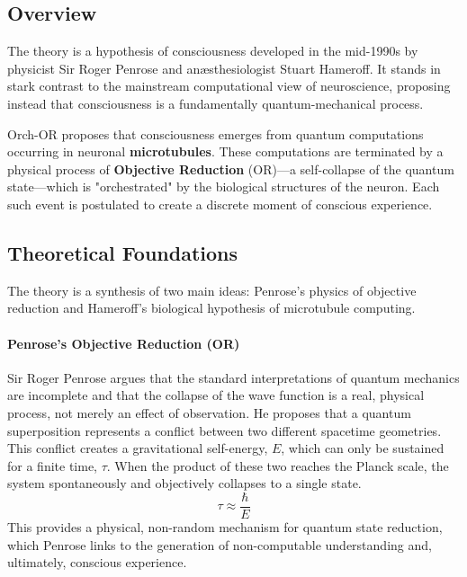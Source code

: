 \subsection{Overview}

The  theory is a hypothesis of consciousness developed in the mid-1990s by physicist Sir Roger Penrose and anæsthesiologist Stuart Hameroff. It stands in stark contrast to the mainstream computational view of neuroscience, proposing instead that consciousness is a fundamentally quantum-mechanical process.

\begin{keyconcept}
    Orch-OR proposes that consciousness emerges from quantum computations occurring in neuronal \textbf{microtubules}. These computations are terminated by a physical process of \textbf{Objective Reduction} (OR)—a self-collapse of the quantum state—which is "orchestrated" by the biological structures of the neuron. Each such event is postulated to create a discrete moment of conscious experience.
\end{keyconcept}

\subsection{Theoretical Foundations}

The theory is a synthesis of two main ideas: Penrose's physics of objective reduction and Hameroff's biological hypothesis of microtubule computing.

\paragraph{Penrose's Objective Reduction (OR)}
Sir Roger Penrose argues that the standard interpretations of quantum mechanics are incomplete and that the collapse of the wave function is a real, physical process, not merely an effect of observation. He proposes that a quantum superposition represents a conflict between two different spacetime geometries. This conflict creates a gravitational self-energy, \(E\), which can only be sustained for a finite time, \(\tau\). When the product of these two reaches the Planck scale, the system spontaneously and objectively collapses to a single state.
\begin{equation}
\label{eq:or-criterion}
\tau \approx \frac{\hbar}{E}
\end{equation}
This provides a physical, non-random mechanism for quantum state reduction, which Penrose links to the generation of non-computable understanding and, ultimately, conscious experience.

